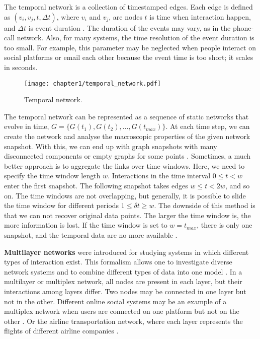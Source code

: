 The temporal network is a collection of timestamped edges. Each edge is defined as $(v_i, v_j, t, \Delta t)$, where $v_i$ and $v_j$, are nodes $t$ is time when interaction happen, and $\Delta t$ is event duration \cite{guide_temporal}. The duration of the events may vary, as in the phone-call network. Also, for many systems, the time resolution of the event duration is too small. For example, this parameter may be neglected when people interact on social platforms or email each other because the event time is too short; it scales in seconds.

\begin{figure}[h]
	\centering
	\texttt{[image: chapter1/temporal\_network.pdf]} 
	\caption[Temporal network.]{Temporal network. }
	\label{fig:gt3}
\end{figure}

The temporal network can be represented as a sequence of static networks that evolve in time, $G = \{ G(t_1), G(t_2), ..., G(t_{max})\}$. At each time step, we can create the network and analyse the macroscopic properties of the given network snapshot. With this, we can end up with graph snapshots with many disconnected components or empty graphs for some points \cite{holme2015modern}. Sometimes, a much better approach is to aggregate the links over time windows. Here, we need to specify the time window length $w$. Interactions in the time interval $0\leq t<w$ enter the first snapshot. The following snapshot takes edges $w \leq t <2w$, and so on. The time windows are not overlapping, but generally, it is possible to slide the time window for different periods $ 1 \leq \delta t \geq w$. The downside of this method is that we can not recover original data points. The larger the time window is, the more information is lost. If the time window is set to $w=t_{max}$, there is only one snapshot, and the temporal data are no more available \cite{krings2012effects, arnold2021moving}. 

\textbf{Multilayer networks} were introduced for studying systems in which different types of interaction exist. This formalism allows one to investigate diverse network systems and to combine different types of data into one model \cite{porter2018multilayer}. In a multilayer or multiplex network, all nodes are present in each layer, but their interactions among layers differ. Two nodes may be connected in one layer but not in the other. Different online social systems may be an example of a multiplex network when users are connected on one platform but not on the other \cite{aleta2019multilayer}. Or the airline transportation network, where each layer represents the flights of different airline companies \cite{kivelamultilayer}.  


